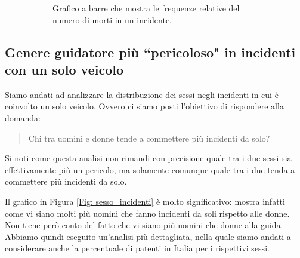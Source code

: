 \documentclass[12pt,a4paper,final,oneside]{article}			%
\begin{document}
\begin{figure}[h!]
\begin{subfigure}{0.48\textwidth}
                \caption{Grafico a barre che mostra le frequenze relative del numero di morti in un incidente.}
                \label{Fig: numero_feriti_per_incidente}
            \end{subfigure}
            \caption{}
        \end{figure}
       
        
    \subsection{Genere guidatore più ``pericoloso" in incidenti con un solo veicolo}

        
        Siamo andati ad analizzare la distribuzione dei sessi negli incidenti in cui è coinvolto un solo veicolo. Ovvero ci siamo posti l'obiettivo di rispondere alla domanda: 
        \begin{quote}
        Chi tra uomini e donne tende a commettere più incidenti da solo?
        \end{quote}
        
        Si noti come questa analisi non rimandi con precisione quale tra i due sessi sia effettivamente più un pericolo, ma solamente comunque quale tra i due tenda a commettere più incidenti da solo.
        
        Il grafico in Figura \ref{Fig: sesso_incidenti} è molto significativo: mostra infatti come vi siano molti più uomini che fanno incidenti da soli rispetto alle donne. Non tiene però conto del fatto che vi siano più uomini che donne alla guida. Abbiamo quindi eseguito un'analisi più dettagliata, nella quale siamo andati a considerare anche la percentuale di patenti in Italia per i rispettivi sessi.
        
\end{document}

